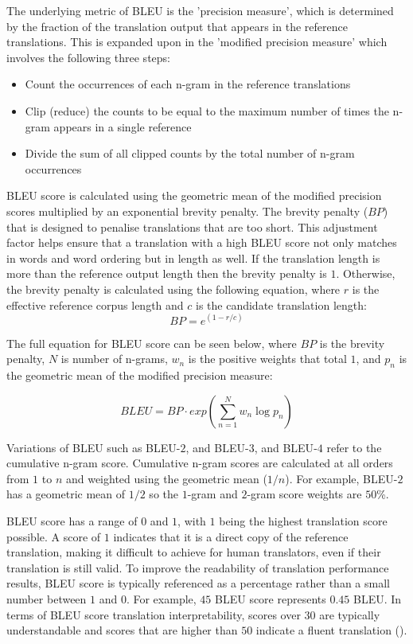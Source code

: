 The underlying metric of \acrshort{BLEU} is the 'precision measure', which is determined by the fraction of the translation output that appears in the reference translations. This is expanded upon in the 'modified precision measure' which involves the following three steps:
\begin{itemize}
    \item Count the occurrences of each n-gram in the reference translations
    \item Clip (reduce) the counts to be equal to the maximum number of times the n-gram appears in a single reference
    \item Divide the sum of all clipped counts by the total number of n-gram occurrences
\end{itemize}

\acrshort{BLEU} score is calculated using the geometric mean of the modified precision scores multiplied by an exponential brevity penalty.
The brevity penalty ($BP$) that is designed to penalise translations that are too short. This adjustment factor helps ensure that a translation with a high \acrshort{BLEU} score not only matches in words and word ordering but in length as well.
If the translation length is more than the reference output length then the brevity penalty is $1$. Otherwise, the brevity penalty is calculated using the following equation, where $r$ is the effective reference corpus length and $c$ is the candidate translation length:
\begin{equation}
    BP = e^{(1-r/c)}
\end{equation}

The full equation for BLEU score can be seen below, where $BP$ is the brevity penalty, $N$ is number of n-grams, $w_n$ is the positive weights that total $1$, and $p_n$ is the geometric mean of the modified precision measure:

\begin{equation}
    BLEU = BP \cdot exp\left (  \sum_{n=1}^{N} w_{n} \log  p_{n}\right )
\end{equation}


Variations of BLEU such as \acrshort{BLEU}-$2$, and \acrshort{BLEU}-$3$, and \acrshort{BLEU}-$4$ refer to the cumulative n-gram score. Cumulative n-gram scores are calculated at all orders from $1$ to $n$ and weighted using the geometric mean ($1/n$). For example, \acrshort{BLEU}-$2$ has a geometric mean of $1/2$ so the $1$-gram and $2$-gram score weights are $50$\%.

\acrshort{BLEU} score has a range of $0$ and $1$, with $1$ being the highest translation score possible. A score of $1$ indicates that it is a direct copy of the reference translation, making it difficult to achieve for human translators, even if their translation is still valid. To improve the readability of translation performance results, \acrshort{BLEU} score is typically referenced as a percentage rather than a small number between $1$ and $0$. For example, $45$ \acrshort{BLEU} score represents $0.45$ \acrshort{BLEU}. In terms of \acrshort{BLEU} score translation interpretability, scores over $30$ are typically understandable and scores that are higher than $50$ indicate a fluent translation (\cite{lavie_evaluating_2010}).

